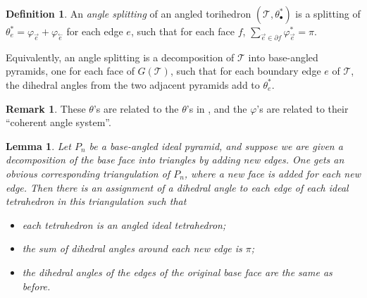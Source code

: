 \documentclass[11pt]{amsart}
\newcommand{\sT}{{\mathcal{T}}}
\newcommand{\cev}[1]{\overset{\leftarrow}{#1}}
\newcommand{\del}{\partial}
\newcommand{\vphi}{\varphi}
\theoremstyle{plain}
\newtheorem{lemma}[theorem]{Lemma}
\theoremstyle{definition}
\newtheorem{definition}[theorem]{Definition}
\newtheorem{remark}[theorem]{Remark}
\begin{document}
\begin{definition}
An \emph{angle splitting} of an angled torihedron $(\sT,\theta_\bullet^*)$
is a splitting of $\theta_e^* = \vphi_{\vec{e}} + \vphi_{\cev{e}}$
for each edge $e$,
such that for each face $f$,
$\sum_{\vec{e} \in \del f} \vphi_{\vec{e}}^* = \pi$.

Equivalently, an angle splitting is a decomposition of
$\sT$ into base-angled pyramids,
one for each face of $G(\sT)$, such that
for each boundary edge $e$ of $\sT$,
the dihedral angles from the two adjacent pyramids
add to $\theta_e^*$.
\end{definition}

\begin{remark}
These $\theta$'s are related to the $\theta$'s in
\cite{BandS},
and the $\vphi$'s are related to their ``coherent angle system''.
\end{remark}



\begin{lemma}
\label{l:pyramid_decomp}
Let $P_n$ be a base-angled ideal pyramid, and suppose we are given a
decomposition of the base face into triangles by adding new edges.  One gets an
obvious corresponding triangulation of $P_n$, where a new face is added for each
new edge. Then there is an assignment of a dihedral angle to each edge of each
ideal tetrahedron in this triangulation such that
\begin{itemize}
\item each tetrahedron is an angled ideal tetrahedron;
\item the sum of dihedral angles around each new edge is $\pi$;
\item the dihedral angles of the edges of the original base face are the same as
	before.
\end{itemize} 
\end{lemma}
\end{document}
